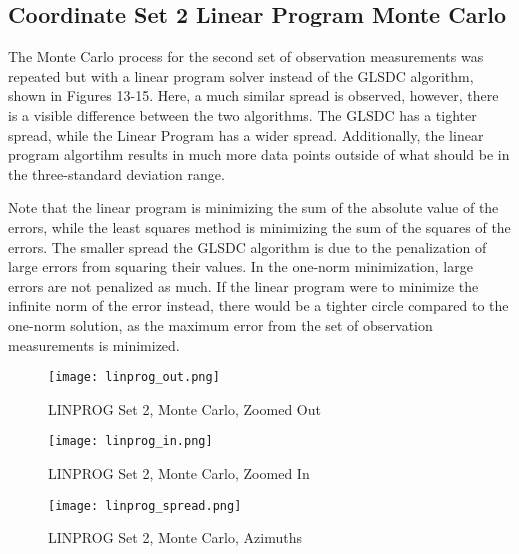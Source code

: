 \documentclass{article}
\begin{document}
\subsection{Coordinate Set 2 Linear Program Monte Carlo}
The Monte Carlo process for the second set of observation measurements was repeated but with a linear program solver instead of the GLSDC algorithm, shown in Figures 13-15. Here, a much similar spread is observed, however, there is a visible difference between the two algorithms. The GLSDC has a tighter spread, while the Linear Program has a wider spread. Additionally, the linear program algortihm results in much more data points outside of what should be in the three-standard deviation range.
\par Note that the linear program is minimizing the sum of the absolute value of the errors, while the least squares method is minimizing the sum of the squares of the errors. The smaller spread the GLSDC algorithm is due to the penalization of large errors from squaring their values. In the one-norm minimization, large errors are not penalized as much. If the linear program were to minimize the infinite norm of the error instead, there would be a tighter circle compared to the one-norm solution, as the maximum error from the set of observation measurements is minimized. 

\begin{figure}[h]
    \centering
    \texttt{[image: linprog\_out.png]}
    \caption{LINPROG Set 2, Monte Carlo, Zoomed Out}
    \label{fig:enter-label}
\end{figure}

\begin{figure}[h]
    \centering
    \texttt{[image: linprog\_in.png]}
    \caption{LINPROG Set 2, Monte Carlo, Zoomed In}
    \label{fig:enter-label}
\end{figure}

\begin{figure}[h]
    \centering
    \texttt{[image: linprog\_spread.png]}
    \caption{LINPROG Set 2, Monte Carlo, Azimuths}
    \label{fig:enter-label}
\end{figure}

\clearpage
\end{document}

